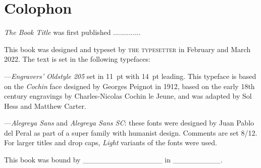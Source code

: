 \documentclass[11pt,showtrims]{memoir} %
\renewcommand{\booktitle}{The Book Title}
\begin{document}
\startappendix
{}

\sffamily
\footnotesize
\printindex[commenter]
\printindex[comments]

\clearpage
\section{Colophon}
\textit{\booktitle} was first published ..............

This book was designed and typeset by \textsc{the typesetter} in February and March 2022.
The text is set in the following typefaces:

---\textit{Engravers' Oldstyle 205} set in 11~pt with 14~pt leading.
This typeface is based on the \textit{Cochin} face designed by Georges Peignot in 1912, based on the early 18th century engravings by Charles-Nicolas Cochin le Jeune, and was adapted by Sol Hess and Matthew Carter.

---\textit{Alegreya Sans} and \textit{Alegreya Sans SC}: these fonts were designed by Juan Pablo del Peral as part of a super family with humanist design. Comments are set 8/12. For larger titles and drop caps, \textit{Light} variants of the fonts were used.

This book was bound by \_\_\_\_\_\_\_\_\_\_\_\_\_\_\_ in \_\_\_\_\_\_\_\_\_.
\end{document}

